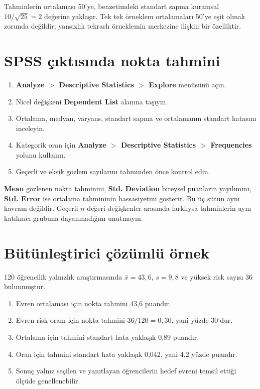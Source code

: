 Tahminlerin ortalaması 50'ye, benzetimdeki standart sapma kuramsal
$10/\sqrt{25}=2$ değerine yaklaşır. Tek tek örneklem ortalamaları 50'ye eşit
olmak zorunda değildir; yansızlık tekrarlı örneklemin merkezine ilişkin bir
özelliktir.

\section{SPSS çıktısında nokta tahmini}

\begin{enumerate}
  \item \textbf{Analyze $>$ Descriptive Statistics $>$ Explore} menüsünü açın.
  \item Nicel değişkeni \textbf{Dependent List} alanına taşıyın.
  \item Ortalama, medyan, varyans, standart sapma ve ortalamanın standart hatasını inceleyin.
  \item Kategorik oran için \textbf{Analyze $>$ Descriptive Statistics $>$ Frequencies} yolunu kullanın.
  \item Geçerli ve eksik gözlem sayılarını tahminden önce kontrol edin.
\end{enumerate}

\begin{outputguidebox}
\textbf{Mean} gözlenen nokta tahminini, \textbf{Std. Deviation} bireysel
puanların yayılımını, \textbf{Std. Error} ise ortalama tahmininin hassasiyetini
gösterir. Bu üç sütun aynı kavram değildir. Geçerli $n$ değeri değişkenler
arasında farklıysa tahminlerin aynı katılımcı grubuna dayanmadığını unutmayın.
\end{outputguidebox}

\section{Bütünleştirici çözümlü örnek}

120 öğrencilik yalnızlık araştırmasında $\bar x=43{,}6$, $s=9{,}8$ ve yüksek
risk sayısı 36 bulunmuştur.

\begin{enumerate}
  \item Evren ortalaması için nokta tahmini 43,6 puandır.
  \item Evren risk oranı için nokta tahmini $36/120=0{,}30$, yani yüzde 30'dur.
  \item Ortalama için tahmini standart hata yaklaşık 0,89 puandır.
  \item Oran için tahmini standart hata yaklaşık 0,042, yani 4,2 yüzde puandır.
  \item Sonuç yalnız seçilen ve yanıtlayan öğrencilerin hedef evreni temsil ettiği ölçüde genellenebilir.
\end{enumerate}

